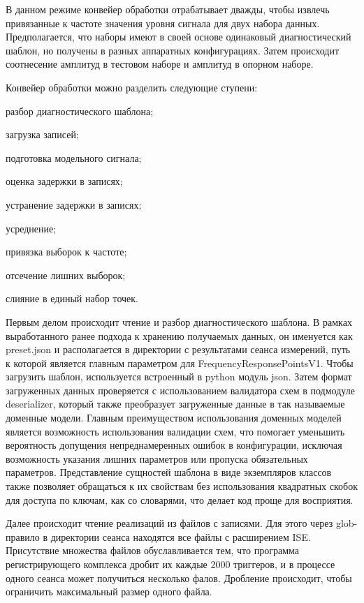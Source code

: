 \documentclass{report}
\begin{document}
В данном режиме конвейер обработки отрабатывает дважды, чтобы извлечь привязанные к частоте значения уровня сигнала для двух набора данных. Предполагается, что наборы имеют в своей основе одинаковый диагностический шаблон, но получены в разных аппаратных конфигурациях. Затем происходит соотнесение амплитуд в тестовом наборе и амплитуд в опорном наборе.

Конвейер обработки можно разделить следующие ступени:

\begin{enummarker}
    \item разбор диагностического шаблона;
    \item загрузка записей;
    \item подготовка модельного сигнала;
    \item оценка задержки в записях;
    \item устранение задержки в записях;
    \item усреднение;
    \item привязка выборок к частоте;
    \item отсечение лишних выборок;
    \item слияние в единый набор точек.
\end{enummarker}

Первым делом происходит чтение и разбор диагностического шаблона. В рамках выработанного ранее подхода к хранению получаемых данных, он именуется как preset.json и располагается в директории с результатами сеанса измерений, путь к которой является главным параметром для FrequencyResponsePointsV1. Чтобы загрузить шаблон, используется встроенный в python модуль json. Затем формат загруженных данных проверяется с использованием валидатора схем в подмодуле deserializer, который также преобразует загруженные данные в так называемые доменные модели. Главным преимуществом использования доменных моделей является возможность использования валидации схем, что помогает уменьшить вероятность допущения непреднамеренных ошибок в конфигурации, исключая возможность указания лишних параметров или пропуска обязательных параметров. Представление сущностей шаблона в виде экземпляров классов также позволяет обращаться к их свойствам без использования квадратных скобок для доступа по ключам, как со словарями, что делает код проще для восприятия.

Далее происходит чтение реализаций из файлов с записями. Для этого через glob-правило в директории сеанса находятся все файлы с расширением ISE. Присутствие множества файлов обуславливается тем, что программа регистрирующего комплекса дробит их каждые 2000 триггеров, и в процессе одного сеанса может получиться несколько фалов. Дробление происходит, чтобы ограничить максимальный размер одного файла.
\end{document}
